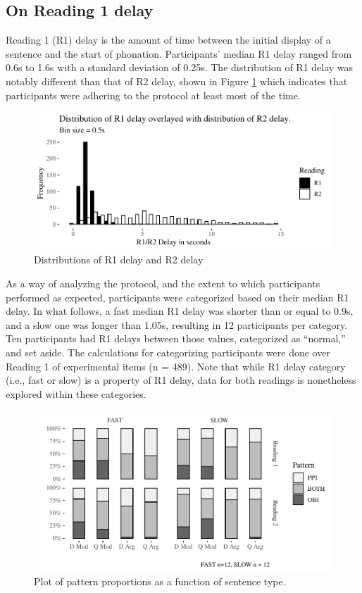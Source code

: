 \documentclass[12pt,oneside]{book}
\begin{document}
\hypertarget{on-reading-1-delay}{%
\subsection{On Reading 1 delay}\label{on-reading-1-delay}}

Reading 1 (R1) delay is the amount of time between the initial display of a sentence and the start of phonation. Participants' median R1 delay ranged from 0.6s to 1.6s with a standard deviation of 0.25s. The distribution of R1 delay was notably different than that of R2 delay, shown in Figure \ref{fig:delayComparison} which indicates that participants were adhering to the protocol at least most of the time.

\begin{figure}
\centering
\includegraphics{4-results_files/figure-latex/delayComparison-1.pdf}
\caption{\label{fig:delayComparison}Distributions of R1 delay and R2 delay}
\end{figure}

As a way of analyzing the protocol, and the extent to which participants performed as expected, participants were categorized based on their median R1 delay. In what follows, a fast median R1 delay was shorter than or equal to 0.9s, and a slow one was longer than 1.05s, resulting in 12 participants per category. Ten participants had R1 delays between those values, categorized as ``normal,'' and set aside. The calculations for categorizing participants were done over Reading 1 of experimental items (n = 489). Note that while R1 delay category (i.e., fast or slow) is a property of R1 delay, data for both readings is nonetheless explored within these categories.

\begin{figure}
\centering
\includegraphics{4-results_files/figure-latex/facet-1.pdf}
\caption{\label{fig:facet}Plot of pattern proportions as a function of sentence type.}
\end{figure}
\end{document}
